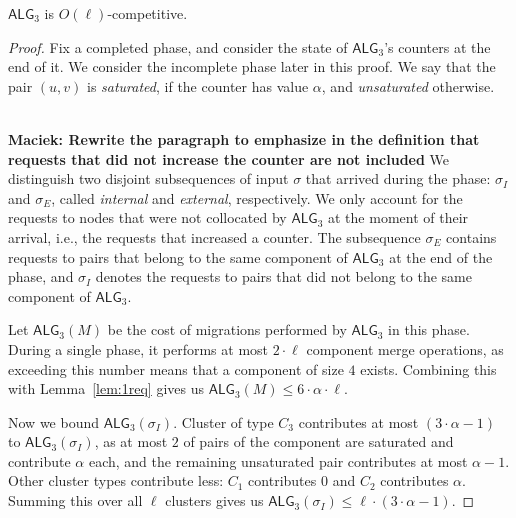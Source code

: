 \documentclass[manuscript,screen=true]{acmart}
\newcommand{\TAlg}{{\ensuremath{\textsf{ALG}_{3}}}\xspace} %
\newcommand\maciek[1]{\color{brown}\textbf{\\ Maciek: #1}\color{black}}
\begin{document}
\begin{theorem}
  \TAlg is $O(\ell)$-competitive.
\end{theorem}
\begin{proof}
  Fix a completed phase, and consider the state of \TAlg's counters at the end of it.
  We consider the incomplete phase later in this proof.
  We say that the pair $(u, v)$ is \emph{saturated}, if the counter has value $\alpha$, and \emph{unsaturated} otherwise.

  \maciek{Rewrite the paragraph to emphasize in the definition that requests that did not increase the counter are not included}
  We distinguish two disjoint subsequences of input $\sigma$ that arrived during the phase: $\sigma_I$ and $\sigma_E$, called \emph{internal} and \emph{external}, respectively.
  We only account for the requests to nodes that were not collocated by \TAlg at the moment of their arrival, i.e., the requests that increased a counter.
  The subsequence $\sigma_E$ contains requests to pairs that belong to the same component of \TAlg{} at the end of the phase, and $\sigma_I$ denotes the requests to pairs that did not belong to the same component of \TAlg.

  Let $\TAlg(M)$ be the cost of migrations performed by \TAlg in this phase.
  During a single phase, it performs at most $2\cdot \ell$ component merge operations, as
  exceeding this number means that a component of size $4$ exists.
  Combining this with Lemma~\ref{lem:1req} gives us $\TAlg(M) \leq 6\cdot\alpha\cdot\ell$.
  
  Now we bound $\TAlg(\sigma_I)$.
  Cluster of type $C_3$ contributes at most $(3\cdot \alpha - 1)$ to $\TAlg(\sigma_I)$, as at most $2$ of pairs of the component are saturated and contribute $\alpha$ each, and the remaining unsaturated pair contributes at most $\alpha-1$.
  Other cluster types contribute less: $C_1$ contributes $0$ and $C_2$ contributes $\alpha$.
  Summing this over all $\ell$ clusters gives us $\TAlg(\sigma_I) \leq \ell \cdot (3\cdot \alpha-1)$.



\end{proof}
\end{document}
